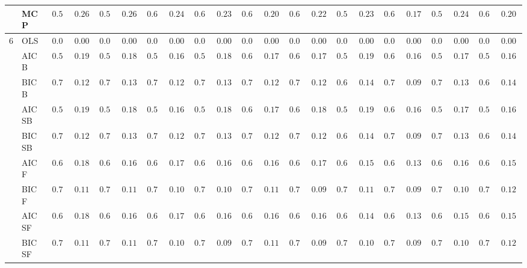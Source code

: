 \begin{tabular}{ll|ll|llllll|llllll|llllll}
 & MCP  & $0.590$ & $0.2627$ & $0.580$ & $0.2629$ & $0.610$ & $0.2468$ & $0.626$ & $0.2321$ & $0.656$ & $0.2071$ & $0.642$ & $0.2226$ & $0.594$ & $0.2317$ & $0.664$ & $0.1795$ & $0.598$ & $0.2486$ & $0.662$ & $0.2004$ \\\hline
6 & OLS  & $0.000$ & $0.0000$ & $0.000$ & $0.0000$ & $0.000$ & $0.0000$ & $0.000$ & $0.0000$ & $0.000$ & $0.0000$ & $0.000$ & $0.0000$ & $0.000$ & $0.0000$ & $0.000$ & $0.0000$ & $0.000$ & $0.0000$ & $0.000$ & $0.0000$ \\
 & AIC B  & $0.594$ & $0.1979$ & $0.578$ & $0.1883$ & $0.590$ & $0.1691$ & $0.590$ & $0.1829$ & $0.612$ & $0.1725$ & $0.634$ & $0.1799$ & $0.570$ & $0.1936$ & $0.644$ & $0.1623$ & $0.584$ & $0.1791$ & $0.590$ & $0.1617$ \\
 & BIC B  & $0.720$ & $0.1271$ & $0.706$ & $0.1347$ & $0.700$ & $0.1287$ & $0.700$ & $0.1318$ & $0.740$ & $0.1223$ & $0.732$ & $0.1246$ & $0.690$ & $0.1432$ & $0.744$ & $0.0988$ & $0.706$ & $0.1347$ & $0.688$ & $0.1402$ \\
 & AIC SB  & $0.594$ & $0.1979$ & $0.578$ & $0.1883$ & $0.588$ & $0.1677$ & $0.590$ & $0.1829$ & $0.612$ & $0.1725$ & $0.634$ & $0.1821$ & $0.568$ & $0.1943$ & $0.642$ & $0.1615$ & $0.584$ & $0.1791$ & $0.588$ & $0.1629$ \\
 & BIC SB  & $0.720$ & $0.1271$ & $0.706$ & $0.1347$ & $0.700$ & $0.1287$ & $0.700$ & $0.1318$ & $0.740$ & $0.1223$ & $0.730$ & $0.1283$ & $0.690$ & $0.1432$ & $0.744$ & $0.0988$ & $0.704$ & $0.1348$ & $0.686$ & $0.1400$ \\
 & AIC F  & $0.620$ & $0.1853$ & $0.614$ & $0.1688$ & $0.620$ & $0.1764$ & $0.662$ & $0.1674$ & $0.624$ & $0.1615$ & $0.664$ & $0.1703$ & $0.654$ & $0.1500$ & $0.676$ & $0.1357$ & $0.642$ & $0.1615$ & $0.626$ & $0.1574$ \\
 & BIC F  & $0.734$ & $0.1174$ & $0.722$ & $0.1133$ & $0.734$ & $0.1066$ & $0.738$ & $0.1013$ & $0.750$ & $0.1115$ & $0.750$ & $0.0959$ & $0.724$ & $0.1129$ & $0.748$ & $0.0926$ & $0.738$ & $0.1013$ & $0.714$ & $0.1215$ \\
 & AIC SF  & $0.622$ & $0.1840$ & $0.616$ & $0.1674$ & $0.622$ & $0.1750$ & $0.664$ & $0.1630$ & $0.622$ & $0.1630$ & $0.666$ & $0.1683$ & $0.658$ & $0.1458$ & $0.678$ & $0.1330$ & $0.646$ & $0.1553$ & $0.628$ & $0.1558$ \\
 & BIC SF  & $0.734$ & $0.1174$ & $0.722$ & $0.1133$ & $0.734$ & $0.1066$ & $0.740$ & $0.0964$ & $0.750$ & $0.1115$ & $0.750$ & $0.0959$ & $0.726$ & $0.1088$ & $0.748$ & $0.0926$ & $0.738$ & $0.1013$ & $0.714$ & $0.1215$ \\

\end{tabular}

